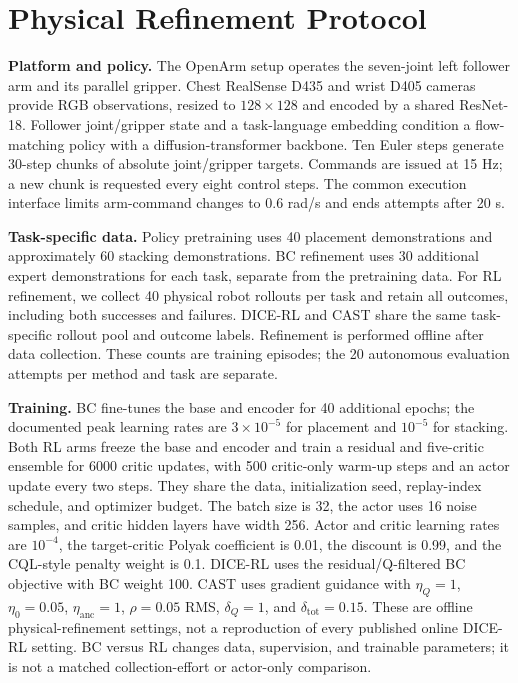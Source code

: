 \section{Physical Refinement Protocol}
\label{supp:physical}
\textbf{Platform and policy.}
The OpenArm setup operates the seven-joint left follower arm and its
parallel gripper. Chest RealSense D435 and wrist D405 cameras provide RGB
observations, resized to $128\times128$ and encoded by a shared
ResNet-18. Follower joint/gripper state and a task-language embedding
condition a flow-matching policy with a diffusion-transformer backbone.
Ten Euler steps generate 30-step chunks of absolute joint/gripper targets.
Commands are issued at 15 Hz; a new chunk is requested every eight control
steps. The common execution interface limits arm-command changes to
0.6 rad/s and ends attempts after 20 s.

\textbf{Task-specific data.}
Policy pretraining uses 40 placement demonstrations and approximately
60 stacking demonstrations. BC refinement uses 30 additional expert
demonstrations for each task, separate from the pretraining data. For RL
refinement, we collect 40 physical robot rollouts per task and retain all
outcomes, including both successes and failures. DICE-RL and CAST share
the same task-specific rollout pool and outcome labels. Refinement is
performed offline after data collection. These counts are training
episodes; the 20 autonomous evaluation attempts per method and task are
separate.

\textbf{Training.}
BC fine-tunes the base and encoder for 40 additional epochs; the documented
peak learning rates are $3\times10^{-5}$ for placement and $10^{-5}$ for
stacking. Both RL arms freeze the base and encoder and train a residual
and five-critic ensemble for 6000 critic updates, with 500 critic-only
warm-up steps and an actor update every two steps. They share the data,
initialization seed, replay-index schedule, and optimizer budget. The
batch size is 32, the actor uses 16 noise samples, and critic hidden
layers have width 256. Actor and
critic learning rates are $10^{-4}$, the target-critic Polyak coefficient
is 0.01, the discount is 0.99, and the CQL-style penalty weight is 0.1.
DICE-RL uses the residual/Q-filtered BC objective with BC weight 100.
CAST uses gradient guidance with $\eta_Q=1$, $\eta_0=0.05$,
$\eta_{\mathrm{anc}}=1$, $\rho=0.05$ RMS, $\delta_Q=1$, and
$\delta_{\mathrm{tot}}=0.15$. These are offline physical-refinement
settings, not a reproduction of every published online DICE-RL setting.
BC versus RL changes data, supervision, and trainable parameters; it is
not a matched collection-effort or actor-only comparison.

